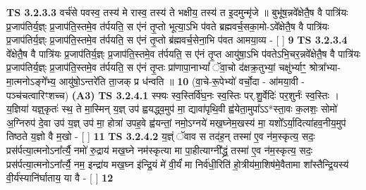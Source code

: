 \documentclass[17pt]{extarticle}
\begin{document}
                  \newline
                                \textbf{ TS 3.2.3.3} \newline
                  वर्च॑से पवस्व॒ तस्य॑ मे रास्व॒ तस्य॑ ते भक्षीय॒ तस्य॑ त इ॒दमुन्मृ॑जे ॥ बुभू॑ष॒न्नवे᳚क्षेतै॒ष वै पात्रि॑यः प्र॒जाप॑तिर्य॒ज्ञ्ः प्र॒जाप॑ति॒स्तमे॒व त॑र्पयति॒ स ए॑नं तृ॒प्तो भूत्या॒ऽभि प॑वते ब्रह्मवर्च॒सका॒मो-ऽवे᳚क्षेतै॒ष वै पात्रि॑यः प्र॒जाप॑तिर्य॒ज्ञ्ः प्र॒जाप॑ति॒स्तमे॒व त॑र्पयति॒ स ए॑नं तृ॒प्तो ब्र॑ह्मवर्च॒सेना॒भि प॑वत आमया॒व्य - [  ] \textbf{  9} \newline
                  \newline
                                \textbf{ TS 3.2.3.4} \newline
                  वे᳚क्षेतै॒ष वै पात्रि॑यः प्र॒जाप॑तिर्य॒ज्ञ्ः प्र॒जाप॑ति॒स्तमे॒व त॑र्पयति॒ स ए॑नं तृ॒प्त आयु॑षा॒ऽभि प॑वतेऽभि॒चर॒न्नवे᳚क्षेतै॒ष वै पात्रि॑यः प्र॒जाप॑तिर्य॒ज्ञ्ः प्र॒जाप॑ति॒स्तमे॒व त॑र्पयति॒ स ए॑नं तृ॒प्तः प्रा॑णापा॒नाभ्यां᳚ ॅवा॒चो द॑क्षक्र॒तुभ्यां॒ चक्षु॑र्भ्याꣳ॒॒ श्रोत्रा᳚भ्या-मा॒त्मनोऽङ्गे᳚भ्य॒ आयु॑षो॒ऽन्तरे॑ति ता॒जक् प्र ध॑न्वति ॥ \textbf{  10} \newline
                  \newline
                      (वा॒चे-रू॒पेभ्यो॑ वर्चो॒दा - आ॑मया॒वी - पञ्च॑चत्वारिꣳशच्च)  \textbf{(A3)} \newline \newline
                                        \textbf{ TS 3.2.4.1} \newline
                  स्फ्यः स्व॒स्तिर्वि॑घ॒नः स्व॒स्तिः पर्.शु॒र्वेदिः॑ पर॒शुर्नः॑ स्व॒स्तिः । य॒ज्ञिया॑ यज्ञ्॒कृतः॑ स्थ॒ ते मा॒स्मिन् य॒ज्ञ् उप॑ ह्वयद्ध्व॒मुप॑ मा॒ द्यावा॑पृथि॒वी ह्व॑येता॒मुपा᳚ऽऽ*स्ता॒वः क॒लशः॒ सोमो॑ अ॒ग्निरुप॑ दे॒वा उप॑ य॒ज्ञ् उप॑ मा॒ होत्रा॑ उपह॒वे ह्व॑यन्तां॒ नमो॒ऽग्नये॑ मख॒घ्नेम॒खस्य॑ मा॒ यशो᳚ऽर्या॒दित्या॑हव॒नीय॒मुप॑ तिष्ठते य॒ज्ञो वै म॒खो - [  ] \textbf{  11} \newline
                  \newline
                                \textbf{ TS 3.2.4.2} \newline
                  य॒ज्ञ्ं ॅवाव स तद॑ह॒न् तस्मा॑ ए॒व न॑म॒स्कृत्य॒ सदः॒ प्रस॑र्पत्या॒त्मनोऽना᳚र्त्यै॒ नमो॑ रु॒द्राय॑ मख॒घ्ने नम॑स्कृत्या मा पा॒हीत्याग्नी᳚द्ध्रं॒ तस्मा॑ ए॒व न॑म॒स्कृत्य॒ सदः॒ प्रस॑र्पत्या॒त्मनोऽना᳚र्त्यै॒ नम॒ इन्द्रा॑य मख॒घ्न इ॑न्द्रि॒यं मे॑ वी॒र्यं॑ मा निर्व॑धी॒रिति॑ हो॒त्रीय॑मा॒शिष॑मे॒वैतामा शा᳚स्तैन्द्रि॒यस्य॑ वी॒र्य॑स्यानि॑र्घाताय॒ या वै - [  ] \textbf{  12} \newline
                  \newline
\end{document}
